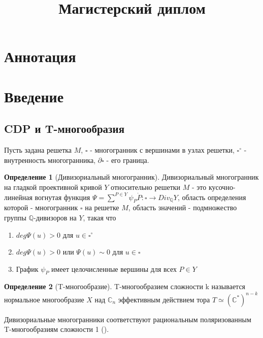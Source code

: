 \documentclass[16pt]{article}
\title{Магистерский диплом}
\theoremstyle{definition}
\newtheorem{definition}{Определение}[section]
\begin{document}
\maketitle

\section{Аннотация}

\clearpage

\tableofcontents

\clearpage

\section{Введение}

\subsection{CDP и T-многообразия}

Пусть задана решетка $M$, $\square$ - многогранник с вершинами в узлах решетки, $\square^{\circ}$ - внутренность многогранника, $\partial\square$ - его граница.
\begin{definition}[Дивизориальный многогранник]
Дивизориальный многогранник на гладкой проективной кривой $Y$ относительно решетки $M$ - это кусочно-линейная вогнутая функция $\Psi = \sum^{P \in Y}\psi_P \dot P: \square \rightarrow Div_{\mathds{Q}}Y$, область определения которой - многогранник $\square$ на решетке $M$, область значений - подмножество группы $\mathds{Q}$-дивизоров на $Y$, такая что
\begin{enumerate}
	\item $deg\Psi(u) > 0$ для $u \in \square^{\circ}$
	\item $deg\Psi(u) > 0$ или $\Psi(u) \sim 0$ для $u \in \square$
	\item График $\psi_P$ имеет целочисленные вершины для всех $P \in Y$
\end{enumerate}
\end{definition}

\begin{definition}[T-многообразие]
T-многообразием сложности k называется нормальное многообразие $X$ над $\mathds{C}_n$ эффективным действием тора $T \simeq (\mathds{C}^{*})^{n-k}$
\end{definition}

Дивизориальные многогранники соответствуют рациональным поляризованным T-многообразиям сложности 1 (\cite{vars}).
\end{document}
